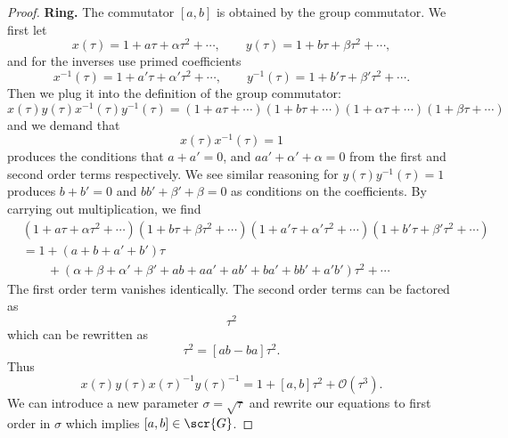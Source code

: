 \begin{proof}
\noindent\textbf{Ring.} The commutator $[a,b]$ is obtained by the
group commutator. We first let
\begin{equation}
x(\tau)=1+a\tau+\alpha\tau^2+\cdots,\qquad y(\tau)=1+b\tau+\beta\tau^{2}+\cdots,
\end{equation}
and for the inverses use primed coefficients
\begin{equation}
x^{-1}(\tau)=1+a'\tau+\alpha'\tau^2+\cdots,\qquad y^{-1}(\tau)=1+b'\tau+\beta'\tau^{2}+\cdots.
\end{equation}
Then we plug it into the definition of the group commutator:
\begin{equation}
x(\tau)y(\tau)x^{-1}(\tau)y^{-1}(\tau)=(1+a\tau+\cdots)(1+b\tau+\cdots)(1+\alpha\tau+\cdots)(1+\beta\tau+\cdots)
\end{equation}
and we demand that
\begin{equation}
x(\tau)x^{-1}(\tau)=1
\end{equation}
produces the conditions that $a+a'=0$, and $aa'+\alpha'+\alpha=0$
from the first and second order terms respectively. We see
similar reasoning for $y(\tau)y^{-1}(\tau)=1$ produces $b+b'=0$
and $bb'+\beta'+\beta=0$ as conditions on the coefficients. By
carrying out multiplication, we find
\begin{align}
&(1+a\tau+\alpha\tau^2+\cdots)(1+b\tau+\beta\tau^{2}+\cdots)
(1+a'\tau+\alpha'\tau^2+\cdots)(1+b'\tau+\beta'\tau^{2}+\cdots)\nonumber\\
&=1+(a+b+a'+b')\tau\nonumber\\
&\qquad+(\alpha+\beta+\alpha'+\beta'+ab+aa'+ab'+ba'+bb'+a'b')\tau^{2}+\cdots
\end{align}
The first order term vanishes identically. The second order terms
can be factored as
\begin{equation}
[(\alpha+\alpha'+aa')+(\beta+\beta'+bb')+ab+ab'+ba'+a'b']\tau^{2}
\end{equation}
which can be rewritten as
\begin{equation}
[ab+(-a)(-b)+a(-b)+(-a)b]\tau^{2}=[ab-ba]\tau^{2}.
\end{equation}
Thus
\begin{equation}
x(\tau)y(\tau)x(\tau)^{-1}y(\tau)^{-1}=1+[a,b]\tau^{2}+\mathcal{O}(\tau^{3}).
\end{equation}
We can introduce a new parameter $\sigma=\sqrt{\tau}$ and rewrite
our equations to first order in $\sigma$ which implies $[a,b]\in\scr{G}$.
\end{proof}

